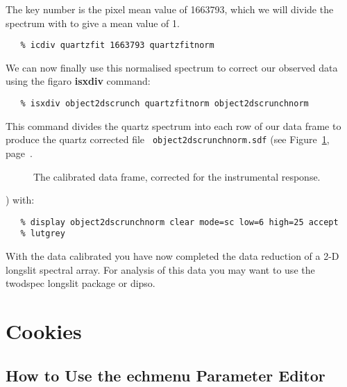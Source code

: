 \documentclass[twoside,11pt]{article}
\newcommand{\stardocinitials}  {SC}
\newcommand{\stardocnumber}    {7.2}
\newcommand{\stardocname}{\stardocinitials /\stardocnumber}
\newcommand{\xref}[3]{#1}
\newcommand{\xlabel}[1]{}
\newcommand{\mlabel}[1]{\xlabel{#1}\label{#1}}
\newcommand{\scspec}[2]{#1}
\newcommand{\scspec}[2]{#2}
\begin{document}
The key number is the pixel mean value of 1663793, which we will
divide the spectrum with to give a mean value of 1.

{\scspec{\small}{ }
\begin{verbatim}
   % icdiv quartzfit 1663793 quartzfitnorm
\end{verbatim}
}

We can now finally use this normalised spectrum to correct our
observed data using the \xref{{\sc figaro}}{sun86}{}
\xref{{\bf isxdiv}}{sun86}{ISXDIV} command:

{\scspec{\small}{ }
\begin{verbatim}
   % isxdiv object2dscrunch quartzfitnorm object2dscrunchnorm
\end{verbatim}
}

This command divides the quartz spectrum into each row of our data
frame to produce the quartz corrected file {\tt
object2dscrunchnorm.sdf} (see \scspec{Figure~\ref{finalcal},
page~\pageref{finalcal}.}{the figure below.}

\begin{figure}
\begin{center}
  \scspec{\leavevmode\epsfysize=105mm\epsfbox{sc7_21.eps}}
          {\leavevmode\epsfysize=136mm}

  \parbox{140mm}{
    \caption{The calibrated data frame, corrected for the instrumental
             response.}
    \label{finalcal}
  }
\end{center}
\end{figure}
 ) with:

{
\scspec{\small}{ }
\begin{verbatim}
   % display object2dscrunchnorm clear mode=sc low=6 high=25 accept
   % lutgrey
\end{verbatim}
}


With the data calibrated you have now completed the data reduction of
a 2-D longslit spectral array. For analysis of this data you may want
to use the \xref{{\sc twodspec}}{sun16}{}\cite{twodspec} {\sc
longslit} package or \xref{{\sc dipso}}{sun50}{}\cite{dipso}.


\section{\mlabel{cookies}Cookies}
\markboth{Cookies}{\stardocname}

\subsection{\mlabel{cook_parameter_editor}How to Use the {\bf echmenu}
            Parameter Editor}
\end{document}
